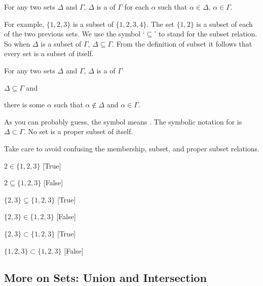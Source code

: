 \begin{majorILnc}{} For any two sets $\Delta$ and $\Gamma$, $\Delta$ is a  of $\Gamma$ \Iff for each $\alpha$ such that $\alpha \in \Delta$, $\alpha \in \Gamma$.
\end{majorILnc} 

\noindent{}For example, $\{1, 2, 3\}$ is a subset of $\{1, 2, 3, 4\}$. The set $\{1, 2\}$ is a subset of each of the two previous sets.  We use the symbol `$\subseteq$' to stand for the subset relation.  So when $\Delta$ is a subset of $\Gamma$, $\Delta \subseteq \Gamma$. From the definition of subset it follows that every set is a subset of itself.

\begin{majorILnc}{} For any two sets $\Delta$ and $\Gamma$, $\Delta$ is a  of $\Gamma$ \Iff 
	\begin{cenumerate}
		\item $\Delta \subseteq \Gamma$ and
		\item there is some $\alpha$ such that $\alpha \notin \Delta$ and $\alpha \in \Gamma$.
	\end{cenumerate}
\end{majorILnc}

\noindent{}As you can probably guess, the \mention{$\notin$} symbol means . The symbolic notation for  is $\Delta \subset \Gamma$. No set is a proper subset of itself.

Take care to avoid confusing the membership, subset, and proper subset relations.

\begin{menumerate}
	\item $2\in\{1, 2, 3\}$ [True]
	\item $2\subseteq\{1, 2, 3\}$ [False]
	\item $\{2, 3\}\subseteq\{1, 2, 3\}$ [True]
	\item $\{2, 3\}\in\{1, 2, 3\}$ [False]
	\item $\{2, 3\}\subset\{1, 2, 3\}$ [True]
	\item $\{1, 2, 3\}\subset\{1, 2, 3\}$ [False]
\end{menumerate}

\subsection{More on Sets: Union and Intersection}\label{moreonsets}


